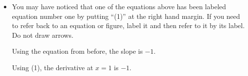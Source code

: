 \begin{itemize}
\begin{goodexample}
    To take the derivative of a product of $2$ functions, we use the
    product rule, $(fg)'=f'g+fg'$.
In our case we have
    \begin{eqnarray*}
      \frac{d}{dx}\left( (x^2 + 1) (x^3 +3) \right) &  = & 
      \left(\frac{d}{dx} (x^2 + 1) \right) (x^3 +3)
	+(x^2 + 1) \left(\frac{d}{dx} (x^3 +3)\right)\\
	& =& (2x)(x^3+3) +(x^2 + 1)(3x^2)\\
      &  = & 5x^4+3x^2+6x.
    \end{eqnarray*}
\end{goodexample}

\item
You may have noticed that one of the equations above has been labeled
equation number one by putting ``(1)'' at the right hand
margin. If you need to refer back to an equation or figure, label it
and then refer to it by its label. Do not draw arrows.

\begin{badexample}
Using the equation from before, the slope is $-1$. 
\end{badexample}

\begin{goodexample}
Using (1), the derivative at $x=1$ is $-1$.
\end{goodexample}
\end{itemize}







